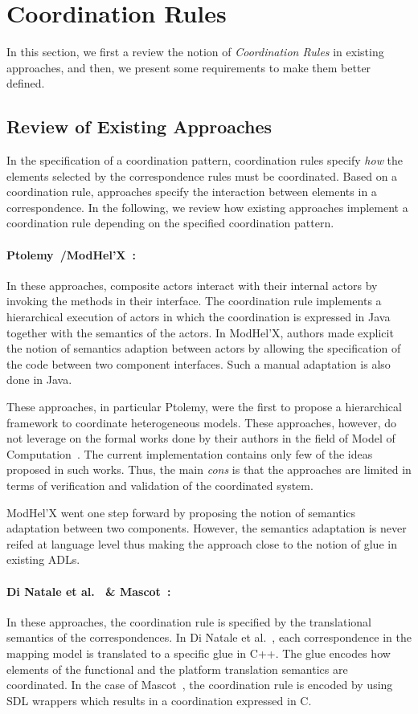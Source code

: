 \section{Coordination Rules}
In this section, we first a review the notion of \emph{Coordination Rules} in existing approaches, and then, we present some requirements to make them better defined. 

\subsection{Review of Existing Approaches}
In the specification of a coordination pattern, coordination rules specify \emph{how} the elements selected by the correspondence rules must be coordinated. Based on a coordination rule, approaches specify the interaction between elements in a correspondence. In the following, we review how existing approaches implement a coordination rule depending on the specified coordination pattern.  

\paragraph{Ptolemy~\cite{ptoleframebib}/ModHel'X~\cite{modhelxbib}:}	
In these approaches, composite actors interact with their internal actors by invoking the methods in their interface. The coordination rule implements a hierarchical execution of actors in which the coordination is expressed in Java together with the semantics of the actors. In ModHel'X, authors made explicit the notion of semantics adaption between actors by allowing the specification of the code between two component interfaces. Such a manual adaptation is also done in Java.

These approaches, in particular Ptolemy, were the first to propose a hierarchical framework to coordinate heterogeneous models. These approaches, however, do not leverage on the formal works done by their authors in the field of Model of Computation~\cite{lee1998framework}. The current implementation contains only few of the ideas proposed in such works. Thus, the main \emph{cons} is that the approaches are limited in terms of verification and validation of the coordinated system. 

ModHel'X went one step forward by proposing the notion of semantics adaptation between two components. However, the semantics adaptation is never reifed at language level thus making the approach close to the notion of glue in existing ADLs.

\paragraph{Di Natale et al.~\cite{dinatale} \& Mascot~\cite{mascotbib}:}
In these approaches, the coordination rule is specified by the translational semantics of the correspondences. In Di Natale et al.~\cite{dinatale}, each correspondence in the mapping model is translated to a specific glue in C++. The glue encodes how elements of the functional and the platform translation semantics are coordinated. In the case of Mascot~\cite{mascotbib}, the coordination rule is encoded by using SDL wrappers which results in a coordination expressed in C.

